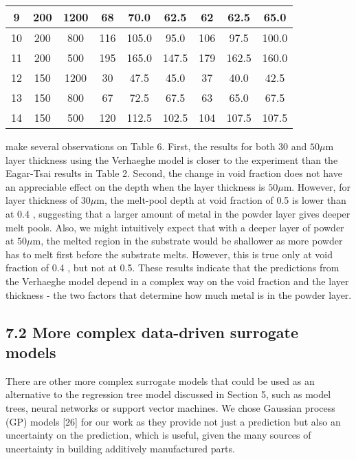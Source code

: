 \documentclass[10pt]{article}
\begin{document}
\begin{center}
\begin{tabular}{|c|c|c|c|c|c|c|c|c|}
\hline
9 & 200 & 1200 & 68 & 70.0 & 62.5 & 62 & 62.5 & 65.0 \\
\hline
10 & 200 & 800 & 116 & 105.0 & 95.0 & 106 & 97.5 & 100.0 \\
\hline
11 & 200 & 500 & 195 & 165.0 & 147.5 & 179 & 162.5 & 160.0 \\
\hline
12 & 150 & 1200 & 30 & 47.5 & 45.0 & 37 & 40.0 & 42.5 \\
\hline
13 & 150 & 800 & 67 & 72.5 & 67.5 & 63 & 65.0 & 67.5 \\
\hline
14 & 150 & 500 & 120 & 112.5 & 102.5 & 104 & 107.5 & 107.5 \\
\hline
\end{tabular}
\end{center}

make several observations on Table 6. First, the results for both 30 and $50 \mu \mathrm{m}$ layer thickness using the Verhaeghe model is closer to the experiment than the Eagar-Tsai results in Table 2. Second, the change in void fraction does not have an appreciable effect on the depth when the layer thickness is $50 \mu \mathrm{m}$. However, for layer thickness of $30 \mu \mathrm{m}$, the melt-pool depth at void fraction of 0.5 is lower than at 0.4 , suggesting that a larger amount of metal in the powder layer gives deeper melt pools. Also, we might intuitively expect that with a deeper layer of powder at $50 \mu \mathrm{m}$, the melted region in the substrate would be shallower as more powder has to melt first before the substrate melts. However, this is true only at void fraction of 0.4 , but not at 0.5. These results indicate that the predictions from the Verhaeghe model depend in a complex way on the void fraction and the layer thickness - the two factors that determine how much metal is in the powder layer.

\subsection*{7.2 More complex data-driven surrogate models}
There are other more complex surrogate models that could be used as an alternative to the regression tree model discussed in Section 5, such as model trees, neural networks or support vector machines. We chose Gaussian process (GP) models [26] for our work as they provide not just a prediction but also an uncertainty on the prediction, which is useful, given the many sources of uncertainty in building additively manufactured parts.
\end{document}
